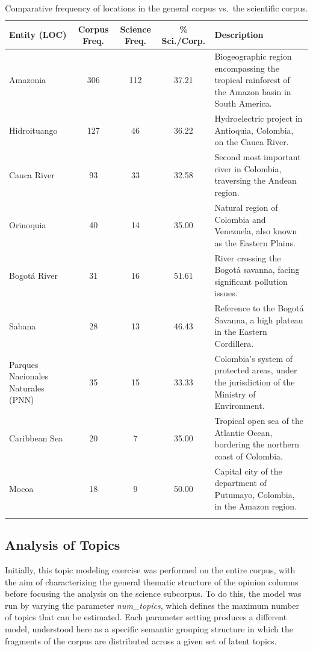 \documentclass[pdflatex,sn-mathphys-num, iicol]{sn-jnl}
\begin{document}
	\begin{table}[h!]
		\caption{Comparative frequency of locations in the general corpus vs.\ the scientific corpus.}
		\label{tab:ents_loc}
		{\footnotesize
			\begin{tabular}{@{}p{3cm}cccP{5.5cm}@{}}
				\toprule
				\textbf{Entity (LOC)} & \textbf{Corpus Freq.} & \textbf{Science Freq.} & \textbf{\% Sci./Corp.} & \textbf{Description} \\
				\midrule
				Amazonia & 306 & 112 & 37.21 & Biogeographic region encompassing the tropical rainforest of the Amazon basin in South America. \\
				Hidroituango & 127 & 46 & 36.22 & Hydroelectric project in Antioquia, Colombia, on the Cauca River. \\
				Cauca River & 93 & 33 & 32.58 & Second most important river in Colombia, traversing the Andean region. \\
				Orinoquia & 40 & 14 & 35.00 & Natural region of Colombia and Venezuela, also known as the Eastern Plains. \\
				Bogotá River & 31 & 16 & 51.61 & River crossing the Bogotá savanna, facing significant pollution issues. \\
				Sabana & 28 & 13 & 46.43 & Reference to the Bogotá Savanna, a high plateau in the Eastern Cordillera. \\
				Parques Nacionales Naturales (PNN) & 35 & 15 & 33.33 & Colombia's system of protected areas, under the jurisdiction of the Ministry of Environment. \\
				Caribbean Sea & 20 & 7 & 35.00 & Tropical open sea of the Atlantic Ocean, bordering the northern coast of Colombia. \\
				Mocoa & 18 & 9 & 50.00 & Capital city of the department of Putumayo, Colombia, in the Amazon region. \\
				\botrule
			\end{tabular}
		}
	\end{table}
	
	\subsection{Analysis of Topics}\label{subsec:topic_results}
	 
	
	Initially, this topic modeling exercise was performed on the entire corpus, with the aim of
	characterizing the general thematic structure of the opinion columns before focusing the analysis
	on the science subcorpus. To do this, the model was run by varying the parameter \textit{num\_topics},
	which defines the maximum number of topics that can be estimated. Each parameter setting
	produces a different model, understood here as a specific semantic grouping structure in which
	the fragments of the corpus are distributed across a given set of latent topics.
	
\end{document}

